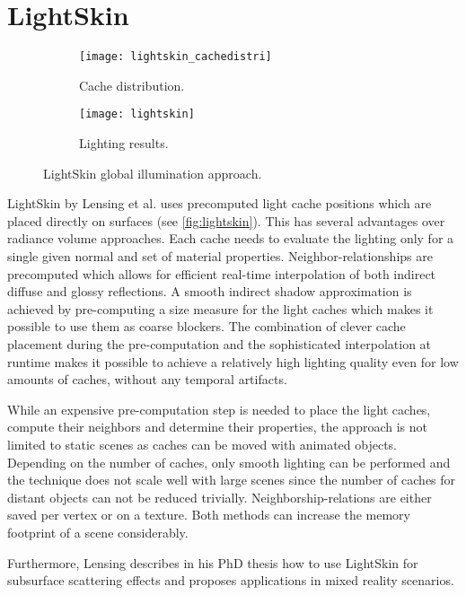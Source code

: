 \documentclass[thesis.tex]{subfiles}
\begin{document}
\section{LightSkin}
\begin{figure}[h]
\centering
\begin{subfigure}[b]{0.49\textwidth}
\centering
\texttt{[image: lightskin\_cachedistri]}
\caption{Cache distribution.}
\end{subfigure}
\begin{subfigure}[b]{0.49\textwidth}
\centering
\texttt{[image: lightskin]}
\caption{Lighting results.}
\end{subfigure}
\caption{\cite{bib:lightskinthesis} LightSkin global illumination approach. } \label{fig:lightskin}
\end{figure}
LightSkin \cite{bib:LightskinPaper} by Lensing et al. uses precomputed light cache positions which are placed directly on surfaces (see \autoref{fig:lightskin}).
This has several advantages over radiance volume approaches.
Each cache needs to evaluate the lighting only for a single given normal and set of material properties.
Neighbor-relationships are precomputed which allows for efficient real-time interpolation of both indirect diffuse and glossy reflections.
A smooth indirect shadow approximation is achieved by pre-computing a size measure for the light caches which makes it possible to use them as coarse blockers.
The combination of clever cache placement during the pre-computation and the sophisticated interpolation at runtime makes it possible to achieve a relatively high lighting quality even for low amounts of caches, without any temporal artifacts.

While an expensive pre-computation step is needed to place the light caches, compute their neighbors and determine their properties, the approach is not limited to static scenes as caches can be moved with animated objects.
Depending on the number of caches, only smooth lighting can be performed and the technique does not scale well with large scenes since the number of caches for distant objects can not be reduced trivially.
Neighborship-relations are either saved per vertex or on a texture. 
Both methods can increase the memory footprint of a scene considerably.

Furthermore, Lensing describes in his PhD thesis \cite{bib:lightskinthesis} how to use LightSkin for subsurface scattering effects and proposes applications in mixed reality scenarios.
\end{document}
